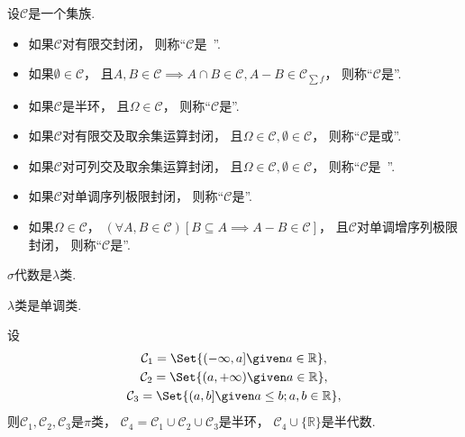 \begin{definition}
设\(\mathcal{C}\)是一个集族.
\begin{itemize}
	\item 如果\(\mathcal{C}\)对有限交封闭，
	则称“\(\mathcal{C}\)是~”.
	\item 如果\(\emptyset\in\mathcal{C}\)，
	且\(A,B\in\mathcal{C} \implies A \cap B \in \mathcal{C}, A-B \in \mathcal{C}_{\sum f}\)，
	则称“\(\mathcal{C}\)是”.
	\item 如果\(\mathcal{C}\)是半环，
	且\(\Omega\in\mathcal{C}\)，
	则称“\(\mathcal{C}\)是”.
	\item 如果\(\mathcal{C}\)对有限交及取余集运算封闭，
	且\(\Omega\in\mathcal{C},
	\emptyset\in\mathcal{C}\)，
	则称“\(\mathcal{C}\)是或”.
	\item 如果\(\mathcal{C}\)对可列交及取余集运算封闭，
	且\(\Omega\in\mathcal{C},
	\emptyset\in\mathcal{C}\)，
	则称“\(\mathcal{C}\)是~”.
	\item 如果\(\mathcal{C}\)对单调序列极限封闭，
	则称“\(\mathcal{C}\)是”.
	\item 如果\(\Omega\in\mathcal{C}\)，
	\((\forall A,B\in\mathcal{C})[B \subseteq A \implies A-B\in\mathcal{C}]\)，
	且\(\mathcal{C}\)对单调增序列极限封闭，
	则称“\(\mathcal{C}\)是”.
\end{itemize}
\end{definition}

\begin{proposition}
\(\sigma\)代数是\(\lambda\)类.
\end{proposition}
\begin{proposition}
\(\lambda\)类是单调类.
\end{proposition}

\begin{example}
设\begin{gather*}
	\mathcal{C}_1 = \Set{ (-\infty,a] \given a\in\mathbb{R} }, \\
	\mathcal{C}_2 = \Set{ (a,+\infty) \given a\in\mathbb{R} }, \\
	\mathcal{C}_3 = \Set{ (a,b] \given a \leq b; a,b\in\mathbb{R} },
\end{gather*}
则\(\mathcal{C}_1,\mathcal{C}_2,\mathcal{C}_3\)是\(\pi\)类，
\(\mathcal{C}_4 = \mathcal{C}_1 \cup \mathcal{C}_2 \cup \mathcal{C}_3\)是半环，
\(\mathcal{C}_4 \cup \{\mathbb{R}\}\)是半代数.
\end{example}

